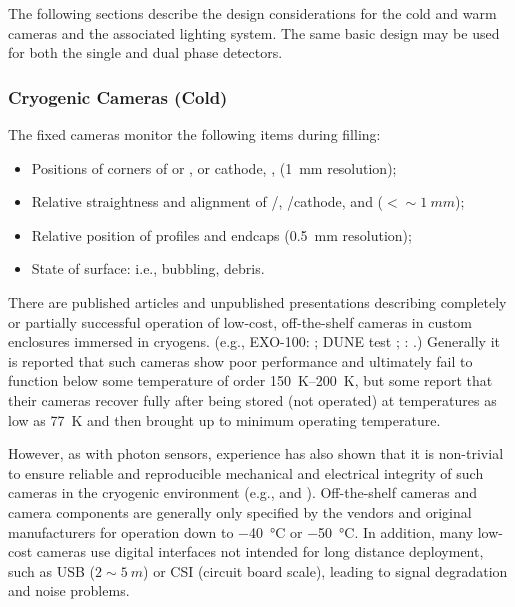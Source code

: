 The following sections describe the design considerations for the cold
and warm cameras and the associated lighting system.  The same basic
design may be used for both the single and dual phase detectors.



\subsubsection{Cryogenic Cameras (Cold)}

The fixed cameras %
monitor the following items during filling:
\begin{itemize}
\item Positions of corners of  or ,  or cathode, ,  (\SI{1}{mm} resolution);
\item Relative straightness and alignment of /, /cathode, and  (\(<\sim\SI{1}{mm}\));
\item Relative position of profiles and endcaps (\SI{0.5}{mm} resolution);
\item State of \lar surface: i.e., bubbling, debris.
\end{itemize}

There are published articles and unpublished presentations describing
completely or partially successful operation of low-cost,
off-the-shelf  cameras in custom enclosures immersed in cryogens.
(e.g., EXO-100: \cite{Delaquis:2013hva}; DUNE  test
\cite{McConkey:2016spe}; : \cite{Murphy:20170516}.)  Generally
it is reported that such cameras show poor performance and ultimately
fail to function below some temperature of order \SIrange{150}{200}{K}, but some report that their cameras recover fully after
being stored (not operated) at temperatures as low as \SI{77}{K} and
then brought up to minimum operating temperature.

However, as with photon sensors, experience has also shown that it is
non-trivial to ensure reliable and reproducible mechanical and
electrical integrity of such cameras in the cryogenic environment 
(e.g., \cite{McConkey:2016spe} and
\cite{Valencia-Rodriquez:20180130}).  Off-the-shelf cameras and camera
components are generally only specified by the vendors and original
manufacturers for operation down to \SI{-40}{\celsius} or \SI{-50}{\celsius}.
In addition, many low-cost cameras use digital interfaces not intended
for long distance deployment, such as USB (\(2\sim\SI{5}{m}\)) or CSI (circuit
board scale), leading to signal degradation and noise problems.

